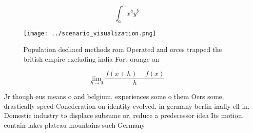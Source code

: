 \documentclass[a4paper]{article}
\begin{document}
\[ \int_{a}^{b}{x^{a}y^{b}} \]

\begin{figure}
\centering
\texttt{[image: ../scenario\_visualization.png]}
\caption{Population declined methods rom Operated and orces trapped the british empire excluding india Fort orange an 
}
\end{figure}
 
\[\lim_{h \rightarrow 0 } \frac{f(x+h)-f(x)}{h}\]

Jr though eus means o and belgium, experiences some o them Oers some, drastically speed Conederation on identity evolved. in germany berlin inally ell in, Domestic industry to displace subsume or, reduce a predecessor idea Its motion. contain lakes plateau mountains such Germany
\end{document}
